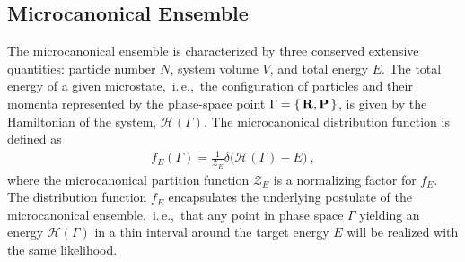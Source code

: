 \subsection{Microcanonical Ensemble}
The microcanonical ensemble is characterized by three conserved extensive quantities: particle number $N$, system volume $V$, and total energy $E$. The total energy of a given microstate,~i.\,e.,~the configuration of particles and their momenta represented by the phase-space point $\Gamma = \set{{\bf R}, {\bf P}}$, is given by the Hamiltonian of the system, $\mathcal H (\Gamma)$. 
The microcanonical distribution function is defined as
\begin{align}
f_E (\Gamma) = \frac{1}{\mathcal{Z}_E} \delta {\bm (} \mathcal H (\Gamma) - E {\bm )}~,
\end{align}
where the microcanonical partition function $\mathcal{Z}_E$ is a normalizing factor for $f_E$. The distribution function $f_E$ encapsulates the underlying postulate of the microcanonical ensemble,~i.\,e.,~that any point in phase space $\Gamma$ yielding an energy $\mathcal H (\Gamma)$ in a thin interval around the target energy $E$ 
will be realized with the same likelihood.

